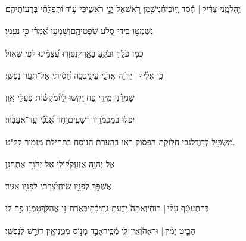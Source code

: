 \documentclass[12pt]{article}
\newcommand{\loc}[1]{\textsuperscript{\locf{#1}}}
\begin{document}
{\loc{ ה}~}‏יֶ֥הֶלְמֵֽנִי צַדִּ֨יק |  חֶ֡סֶד וְֽיוֹכִיחֵ֗נִי{\hfill}שֶׁ֣מֶן רֹ֭אשׁ\newline\hspace*{.5em}אַל־יָנִ֣י רֹאשִׁ֑י{\hfill}כִּי־ע֥וֹד וּ֝תְפִלָּתִ֗י בְּרָעוֹתֵיהֶֽם׃\par

{\loc{ ו}~}‏נִשְׁמְט֣וּ בִֽידֵי־סֶ֭לַע שֹׁפְטֵיהֶ֑ם{\hfill}וְשָׁמְע֥וּ אֲ֝מָרַ֗י כִּ֣י נָעֵֽמוּ׃\par

{\loc{ ז}~}‏כְּמ֤וֹ פֹלֵ֣חַ וּבֹקֵ֣עַ בָּאָ֑רֶץ{\hfill}נִפְזְר֥וּ עֲ֝צָמֵ֗ינוּ לְפִ֣י שְׁאֽוֹל׃\par

{\loc{ ח}~}‏כִּ֤י אֵלֶ֨יךָ |  יֱהֹוִ֣ה אֲדֹנָ֣י עֵינָ֑י{\hfill}בְּכָ֥ה חָ֝סִ֗יתִי אַל־תְּעַ֥ר נַפְשִֽׁי׃\par

{\loc{ ט}~}‏שׇׁמְרֵ֗נִי מִ֣ידֵי פַ֭ח יָ֣קְשׁוּ לִ֑י{\hfill}וּ֝מֹקְשׁ֗וֹת פֹּ֣עֲלֵי אָֽוֶן׃\par

{\loc{ י}~}‏יִפְּל֣וּ בְמַכְמֹרָ֣יו רְשָׁעִ֑ים{\hfill}יַ֥חַד אָ֝נֹכִ֗י עַֽד־אֶעֱבֽוֹר׃\par\pend
\ledpb
\pstart[\subsection*{\textcolor{red}{פרק קמב}}]\label{פרק קמב}
{\loc{ א}~}‏מַשְׂכִּ֥יל לְדָוִ֑ד\newline\hspace*{.5em}לגבי חלוקת הפסוק ראו בהערת הנוסח בתחילת מזמור קל"ט.\par

{\loc{ ב}~}‏ אֶל־יְהֹוָ֣ה אֶזְעָ֑ק{\hfill}ק֝וֹלִ֗י אֶל־יְהֹוָ֥ה אֶתְחַנָּֽן׃\par

{\loc{ ג}~}‏אֶשְׁפֹּ֣ךְ לְפָנָ֣יו שִׂיחִ֑י{\hfill}צָ֝רָתִ֗י לְפָנָ֥יו אַגִּֽיד׃\par

{\loc{ ד}~}‏בְּהִתְעַטֵּ֬ף עָלַ֨י |  רוּחִ֗י{\hfill}וְאַתָּה֮ יָדַ֢עְתָּ נְֽתִיבָ֫תִ֥י\newline\hspace*{.5em}בְּאֹֽרַח־ז֥וּ אֲהַלֵּ֑ךְ{\hfill}טָמְנ֖וּ פַ֣ח לִֽי׃\par

{\loc{ ה}~}‏הַבֵּ֤יט יָמִ֨ין |  וּרְאֵה֮{\hfill}וְאֵֽין־לִ֢י מַ֫כִּ֥יר\newline\hspace*{.5em}אָבַ֣ד מָנ֣וֹס מִמֶּ֑נִּי{\hfill}אֵ֖ין דּוֹרֵ֣שׁ לְנַפְשִֽׁי׃\par
\end{document}

